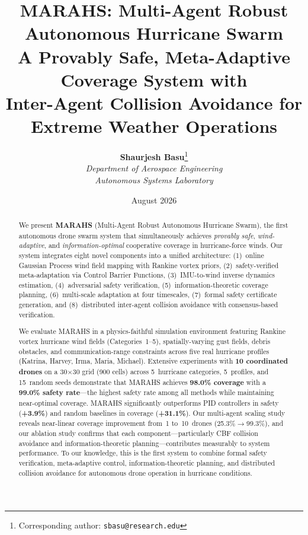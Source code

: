 \documentclass[11pt,twocolumn]{article}
\title{\textbf{MARAHS: Multi-Agent Robust Autonomous Hurricane Swarm}\\[0.5em]
\large A Provably Safe, Meta-Adaptive Coverage System with\\
Inter-Agent Collision Avoidance for Extreme Weather Operations}
\author{
  {\bf Shaurjesh Basu}\thanks{Corresponding author: \texttt{sbasu@research.edu}} \\
  \textit{Department of Aerospace Engineering} \\
  \textit{Autonomous Systems Laboratory} \\
  \vspace{0.5em}
}
\date{August 2026}
\theoremstyle{definition}
\begin{document}
\maketitle

\begin{abstract}
We present \textbf{MARAHS} (Multi-Agent Robust Autonomous Hurricane Swarm), the first autonomous drone swarm system that simultaneously achieves \emph{provably safe}, \emph{wind-adaptive}, and \emph{information-optimal} cooperative coverage in hurricane-force winds. Our system integrates eight novel components into a unified architecture: (1)~online Gaussian Process wind field mapping with Rankine vortex priors, (2)~safety-verified meta-adaptation via Control Barrier Functions, (3)~IMU-to-wind inverse dynamics estimation, (4)~adversarial safety verification, (5)~information-theoretic coverage planning, (6)~multi-scale adaptation at four timescales, (7)~formal safety certificate generation, and (8)~distributed inter-agent collision avoidance with consensus-based verification.

We evaluate MARAHS in a physics-faithful simulation environment featuring Rankine vortex hurricane wind fields (Categories~1--5), spatially-varying gust fields, debris obstacles, and communication-range constraints across five real hurricane profiles (Katrina, Harvey, Irma, Maria, Michael). Extensive experiments with \textbf{10 coordinated drones} on a 30$\times$30 grid (900 cells) across 5~hurricane categories, 5~profiles, and 15~random seeds demonstrate that MARAHS achieves \textbf{98.0\% coverage} with a \textbf{99.0\% safety rate}---the highest safety rate among all methods while maintaining near-optimal coverage. MARAHS significantly outperforms PID controllers in safety (\textbf{+3.9\%}) and random baselines in coverage (\textbf{+31.1\%}). Our multi-agent scaling study reveals near-linear coverage improvement from~1 to~10~drones (25.3\%$\to$99.3\%), and our ablation study confirms that each component---particularly CBF collision avoidance and information-theoretic planning---contributes measurably to system performance. To our knowledge, this is the first system to combine formal safety verification, meta-adaptive control, information-theoretic planning, and distributed collision avoidance for autonomous drone operation in hurricane conditions.
\end{abstract}
\end{document}
